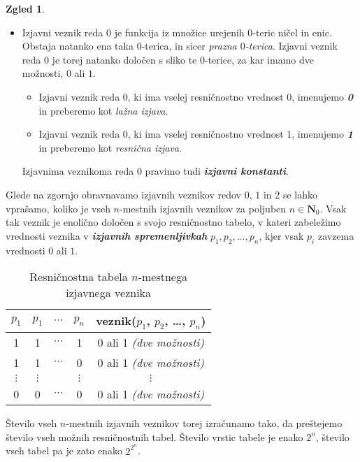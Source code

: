 \documentclass[11pt]{book}
\def\NN{\mathbf{N}}
\def\definicija{\color{rdeca}\bf\em}
\theoremstyle{definition}
\theoremstyle{zgled}
\newtheorem*{zgled}{Zgled}
\theoremstyle{odprtproblem}
\theoremstyle{domacanaloga}
\theoremstyle{izrek}
\begin{document}
\begin{zgled}
\begin{itemize}
    \item Izjavni veznik reda $0$ je funkcija iz množice urejenih $0$-teric ničel in enic. Obstaja natanko ena taka $0$-terica, in sicer \emph{prazna $0$-terica}. Izjavni veznik reda $0$ je torej natanko določen s sliko te $0$-terice, za kar imamo dve možnosti, $0$ ali $1$.
    \begin{itemize}
        \item Izjavni veznik reda $0$, ki ima vselej resničnostno vrednost $0$, imenujemo {\definicija 0} in preberemo kot \emph{lažna izjava}.
        \item Izjavni veznik reda $0$, ki ima vselej resničnostno vrednost $1$, imenujemo {\definicija 1} in preberemo kot \emph{resnična izjava}.
    \end{itemize}
    Izjavnima veznikoma reda $0$ pravimo tudi {\definicija izjavni konstanti}.
\end{itemize}
\end{zgled}

Glede na zgornjo obravnavamo izjavnih veznikov redov $0$, $1$ in $2$ se lahko vprašamo, koliko je vseh $n$-mestnih izjavnih veznikov za poljuben $n \in \NN_0$. Vsak tak veznik je enolično določen s svojo resničnostno tabelo, v kateri zabeležimo vrednosti veznika v {\definicija izjavnih spremenljivkah} $p_1, p_2, \dots, p_n$, kjer vsak $p_i$ zavzema vrednosti $0$ ali $1$.

\begin{table}[h]
    \centering
    \begin{tabular}{cccc|c}
        $p_1$ & $p_1$ & $\cdots$ & $p_n$ & veznik($p_1$, $p_2$, \dots, $p_n$) \\ \hline
        1 & 1 & $\cdots$ & 1 & 0 ali 1 \emph{(dve možnosti)} \\
        1 & 1 & $\cdots$ & 0 & 0 ali 1 \emph{(dve možnosti)} \\
        $\vdots$ & $\vdots$ & & $\vdots$ & $\vdots$ \\
        0 & 0 & $\cdots$ & 0 & 0 ali 1 \emph{(dve možnosti)} \\
    \end{tabular}
    \caption{Resničnostna tabela $n$-mestnega izjavnega veznika}
\end{table}

Število vseh $n$-mestnih izjavnih veznikov torej izračunamo tako, da preštejemo število vseh možnih resničnostnih tabel. Število vrstic tabele je enako $2^n$, število vseh tabel pa je zato enako $2^{2^n}$.
\end{document}
